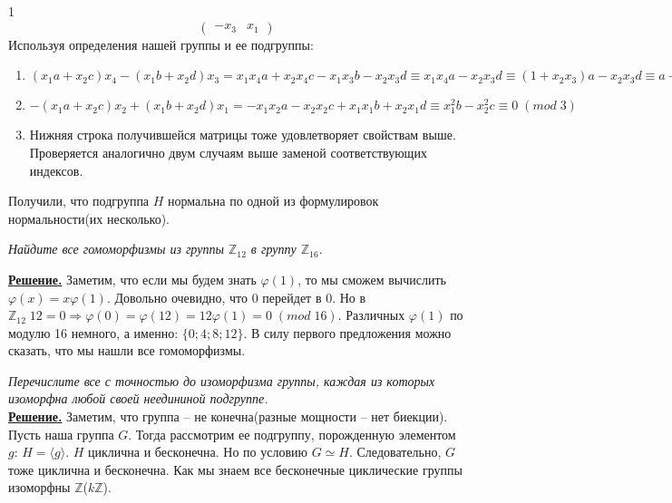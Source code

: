 \documentclass[14pt,a4paper]{scrartcl}
\begin{document}
\begin{spacing}{1}
$$\begin{pmatrix}
	-x_3 & x_1
	\end{pmatrix}
	$$
	Используя определения нашей группы и ее подгруппы:
	\begin{enumerate}
		\item $(x_1a+x_2c)x_4 - (x_1b+x_2d)x_3 = x_1x_4a + x_2x_4c - x_1x_3b-x_2x_3d \equiv x_1x_4a-x_2x_3d \equiv (1 + x_2x_3)a - x_2x_3d \equiv a + x_2x_3(a - d) \equiv a \equiv 1\;(mod\;3)$
		\item $-(x_1a+x_2c)x_2 + (x_1b+x_2d)x_1 = -x_1x_2a - x_2x_2c + x_1x_1b+x_2x_1d \equiv x_1^2b - x_2^2c \equiv 0\;(mod\;3)$
		\item Нижняя строка получившейся матрицы тоже удовлетворяет свойствам выше. Проверяется аналогично двум случаям выше заменой соответствующих индексов.
	\end{enumerate}
	Получили, что подгруппа $H$ нормальна по одной из формулировок нормальности(их несколько).
	
	
	\begin{center}
	\end{center}
	\textit{Найдите все гомоморфизмы из группы $\mathbb{Z}_{12}$ в группу $\mathbb{Z}_{16}$.}
	
	\noindent \textbf{\underline{Решение.}} Заметим, что если мы будем знать $\varphi(1)$, то мы сможем вычислить $\varphi(x) = x\varphi(1)$. Довольно очевидно, что 0 перейдет в 0. Но в $\mathbb{Z}_{12}\;12 = 0 \Rightarrow \varphi(0) = \varphi(12) = 12\varphi(1) = 0\;(mod\;16)$. Различных $\varphi(1)$ по модулю 16 немного, а именно: $\{0; 4; 8; 12\}$. В силу первого предложения можно сказать, что мы нашли все гомоморфизмы. 
	
	\begin{center}
	\end{center}
	\textit{Перечислите все с точностью до изоморфизма группы, каждая из которых изоморфна любой своей неедининой подгруппе.}\\
	\noindent \textbf{\underline{Решение.}} Заметим, что группа -- не конечна(разные мощности -- нет биекции). Пусть наша группа $G$. Тогда рассмотрим ее подгруппу, порожденную элементом $g$: $H = \langle g \rangle$. $H$ циклична и бесконечна. Но по условию $G \simeq H$. Следовательно, $G$ тоже циклична и бесконечна. Как мы знаем все бесконечные циклические группы изоморфны $\mathbb{Z}$($k\mathbb{Z}$).
\end{spacing}
\end{document}
